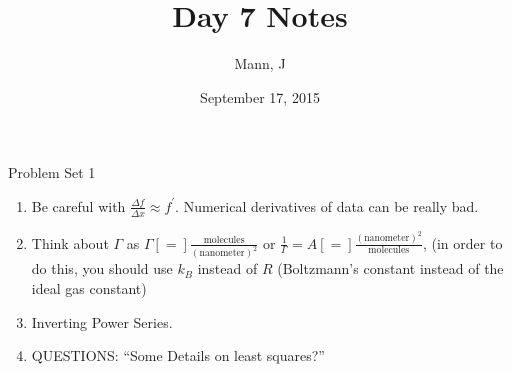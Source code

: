 \documentclass{article}
\author{Mann, J}
\title{Day 7 Notes}
\date{September 17, 2015}
\begin{document}
\maketitle
\begin{section}{Problem Set 1}

	\begin{enumerate}
		\item Be careful with $\frac{\Delta f}{\Delta x}\approx f^\prime$. Numerical derivatives of data can be really bad.
		\item Think about $\Gamma$ as $\Gamma [=] \frac{\text{molecules}}{(\text{nanometer})^2}$ or $\frac{1}{\Gamma} = A [=] \frac{(\text{nanometer})^2}{\text{molecules}}$, (in order to do this, you should use $k_B$ instead of $R$ (Boltzmann's constant instead of the ideal gas constant)
		\item Inverting Power Series.
		\item QUESTIONS: ``Some Details on least squares?''
	\end{enumerate}
\end{section}
\end{document}
